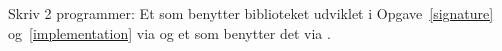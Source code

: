Skriv 2 programmer: Et som benytter biblioteket udviklet i Opgave~\ref{signature} og~\ref{implementation} via  og et som benytter det via .
